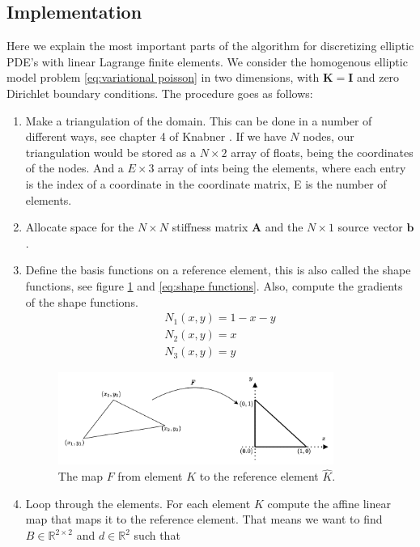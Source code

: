 \documentclass[../Main/main.tex]{subfiles}
\begin{document}
	\subsection{Implementation}

	Here we explain the most important parts of the algorithm for discretizing elliptic PDE's with linear Lagrange finite elements. We consider the homogenous elliptic model problem \eqref{eq:variational poisson} in two dimensions, with $\bm{K} = \bm{I}$ and zero Dirichlet boundary conditions. The procedure goes as follows:
	\begin{enumerate}
		\item Make a triangulation of the domain. This can be done in a number of different ways, see chapter 4 of Knabner \cite{Knabner}. If we have $N$ nodes, our triangulation would be stored as a $N \times 2$ array of floats, being the coordinates of the nodes. And a $E\times 3$ array of ints being the elements, where each entry is the index of a coordinate in the coordinate matrix, E is the number of elements.
		\item Allocate space for the $N \times N$ stiffness matrix $\bm{A}$ and the $N \times 1$ source vector $\bm{b}$.
		\item Define the basis functions on a reference element, this is also called the shape functions, see figure \ref{fig:reference element} and \eqref{eq:shape functions}. Also, compute the gradients of the shape functions. 
		\begin{equation}
			\begin{gathered}\label{eq:shape functions}
				N_1(x,y) = 1-x-y\\
				N_2(x,y) = x\\
				N_3(x,y) = y
			\end{gathered}
		\end{equation}
		\begin{figure}[H]
			\centering
			\includegraphics[width=0.85\textwidth]{reference element.pdf}
			\caption{The map $F$ from element $K$ to the reference element $\hat{K}$.}
			\label{fig:reference element}
		\end{figure}
		\item Loop through the elements. For each element $K$ compute the affine linear map that maps it to the reference element. That means we want to find $B\in \mathbb{R}^{2\times 2}$ and $d\in \mathbb{R}^2$ such that 

\end{enumerate}
\end{document}

